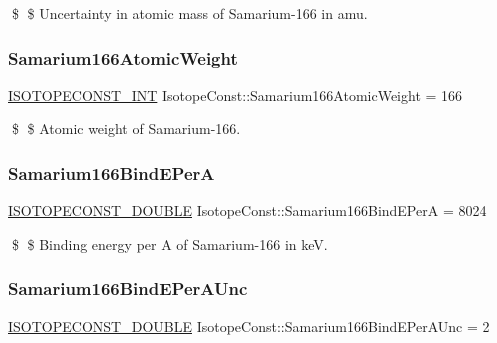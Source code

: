 \$ \$ Uncertainty in atomic mass of Samarium-\/166 in amu. \mbox{\label{group___isotope_const-_samarium-_sm166_ga147a252f4c63497b38e008f636d8f386}} 
\subsubsection{\texorpdfstring{Samarium166\+Atomic\+Weight}{Samarium166AtomicWeight}}
{\footnotesize\ttfamily \mbox{\hyperlink{group___isotope_const-_macros_ga5f18360b3e99483a35c32d789e62621c}{I\+S\+O\+T\+O\+P\+E\+C\+O\+N\+S\+T\+\_\+\+I\+NT}} Isotope\+Const\+::\+Samarium166\+Atomic\+Weight = 166}

\$ \$ Atomic weight of Samarium-\/166. \mbox{\label{group___isotope_const-_samarium-_sm166_ga3ee4cf6b793cbd41607fa69b226ca536}} 
\subsubsection{\texorpdfstring{Samarium166\+Bind\+E\+PerA}{Samarium166BindEPerA}}
{\footnotesize\ttfamily \mbox{\hyperlink{group___isotope_const-_macros_ga8f45a7272ce02c0b4c65c44636ed719a}{I\+S\+O\+T\+O\+P\+E\+C\+O\+N\+S\+T\+\_\+\+D\+O\+U\+B\+LE}} Isotope\+Const\+::\+Samarium166\+Bind\+E\+PerA = 8024}

\$ \$ Binding energy per A of Samarium-\/166 in keV. \mbox{\label{group___isotope_const-_samarium-_sm166_ga89797ca34e4f584949ab3b3a8a6faba0}} 
\subsubsection{\texorpdfstring{Samarium166\+Bind\+E\+Per\+A\+Unc}{Samarium166BindEPerAUnc}}
{\footnotesize\ttfamily \mbox{\hyperlink{group___isotope_const-_macros_ga8f45a7272ce02c0b4c65c44636ed719a}{I\+S\+O\+T\+O\+P\+E\+C\+O\+N\+S\+T\+\_\+\+D\+O\+U\+B\+LE}} Isotope\+Const\+::\+Samarium166\+Bind\+E\+Per\+A\+Unc = 2}

